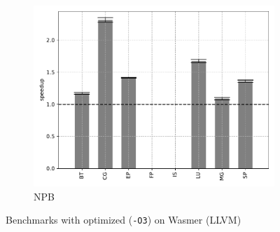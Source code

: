 \begin{figure}
\begin{subfigure}[t]{.45\textwidth}
        \includegraphics[width=\textwidth]
        {Images/6.1.RQ1/npb-wasmer-llvm-opt.pdf}
        \caption{NPB}
    \end{subfigure}
    \caption{Benchmarks with optimized (\texttt{-O3}) on Wasmer (LLVM)}
    \label{fig:rq1-wasmer-llvm-opt}
\end{figure}

